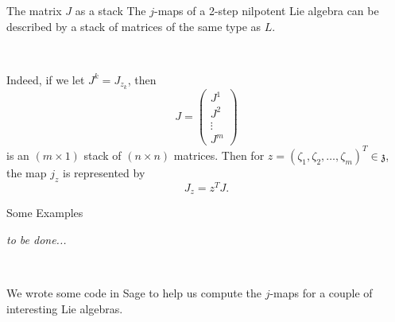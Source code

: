 \documentclass{beamer}
\newcommand{\lal}[1]{\mathfrak{#1}}
\newcommand{\laz}{\lal{z}}
\begin{document}
\begin{frame}{The matrix $J$ as a stack}
The $j$-maps of a 2-step nilpotent Lie algebra can be described by a stack
of matrices of the same type as $L$.
\pause

\

Indeed, if we let $J^k = J_{z_k}$,
\pause
then
$$
J = \begin{pmatrix}
J^1 \\ J^2 \\ \vdots \\ J^m
\end{pmatrix}
$$
is an $(m \times 1)$ stack of $(n \times n)$ matrices.
\pause
Then for $z = (\zeta_1,\zeta_2,\hdots,\zeta_m)^T \in \laz$, the map $j_z$ is 
represented by
\pause
$$
J_z = z^TJ.
$$
\end{frame}

\begin{frame}{Some Examples}
\begin{center}
{\it to be done...}
\end{center}

\

We wrote some code in Sage to help us compute the $j$-maps for a couple of
interesting Lie algebras.
\end{frame}
\end{document}
